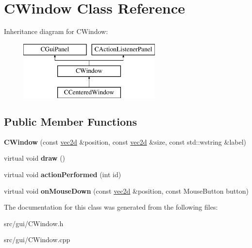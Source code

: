 \hypertarget{class_c_window}{
\section{CWindow Class Reference}
\label{class_c_window}
}
Inheritance diagram for CWindow:\begin{figure}[H]
\begin{center}
\leavevmode
\includegraphics[height=3.000000cm]{class_c_window}
\end{center}
\end{figure}
\subsection*{Public Member Functions}
\begin{DoxyCompactItemize}
\item 
\hypertarget{class_c_window_affbb54629e50a18e9e8c8a35987c3856}{
{\bfseries CWindow} (const \hyperlink{classvec2d}{vec2d} \&position, const \hyperlink{classvec2d}{vec2d} \&size, const std::wstring \&label)}
\label{class_c_window_affbb54629e50a18e9e8c8a35987c3856}

\item 
\hypertarget{class_c_window_a433a3a123bc902f57a204c3970f3fd51}{
virtual void {\bfseries draw} ()}
\label{class_c_window_a433a3a123bc902f57a204c3970f3fd51}

\item 
\hypertarget{class_c_window_adbf4dacd60a4ffea05fed1bab58c8266}{
virtual void {\bfseries actionPerformed} (int id)}
\label{class_c_window_adbf4dacd60a4ffea05fed1bab58c8266}

\item 
\hypertarget{class_c_window_a4143fd3618ac04f39242a649d1e9a1a5}{
virtual void {\bfseries onMouseDown} (const \hyperlink{classvec2d}{vec2d} \&position, const MouseButton button)}
\label{class_c_window_a4143fd3618ac04f39242a649d1e9a1a5}

\end{DoxyCompactItemize}


The documentation for this class was generated from the following files:\begin{DoxyCompactItemize}
\item 
src/gui/CWindow.h\item 
src/gui/CWindow.cpp\end{DoxyCompactItemize}
